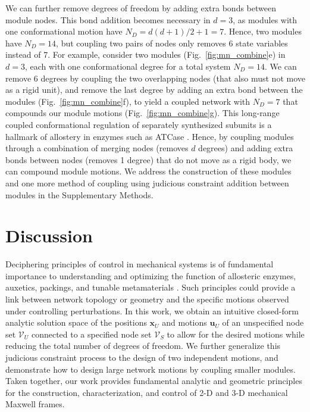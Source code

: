 \documentclass[%
preprint,
 amsmath,amssymb,
 aps,
]{revtex4-1}
\newcommand{\mc}{\mathcal}
\begin{document}
We can further remove degrees of freedom by adding extra bonds between module nodes. This bond addition becomes necessary in $d = 3$, as modules with one conformational motion have $N_D = d(d+1)/2+1 = 7$. Hence, two modules have $N_D = 14$, but coupling two pairs of nodes only removes 6 state variables instead of 7. For example, consider two modules (Fig.~\ref{fig:mn_combine}e) in $d=3$, each with one conformational degree for a total system $N_D = 14$. We can remove 6 degrees by coupling the two overlapping nodes (that also must not move as a rigid unit), and remove the last degree by adding an extra bond between the modules (Fig.~\ref{fig:mn_combine}f), to yield a coupled network with $N_D = 7$ that compounds our module motions (Fig.~\ref{fig:mn_combine}g). This long-range coupled conformational regulation of separately synthesized subunits is a hallmark of allostery in enzymes \cite{changeux1998} such as ATCase \cite{allewell1989,macol2001,cockrell2013}. Hence, by coupling modules through a combination of merging nodes (removes $d$ degrees) and adding extra bonds between nodes (removes 1 degree) that do not move as a rigid body, we can compound module motions. We address the construction of these modules and one more method of coupling using judicious constraint addition between modules in the Supplementary Methods. 




\section{Discussion}

Deciphering principles of control in mechanical systems is of fundamental importance to understanding and optimizing the function of allosteric enzymes, auxetics, packings, and tunable metamaterials \cite{Bertoldi2017,Miskin2013adapting,jacobs2001protein,paulose2015topological,jacobs2012allostery}. Such principles could provide a link between network topology or geometry and the specific motions observed under controlling perturbations. In this work, we obtain an intuitive closed-form analytic solution space of the positions $\bm{x}_U$ and motions $\bm{u}_U$ of an unspecified node set $\mc{V}_U$ connected to a specified node set $\mc{V}_S$ to allow for the desired motions while reducing the total number of degrees of freedom. We further generalize this judicious constraint process to the design of two independent motions, and demonstrate how to design large network motions by coupling smaller modules. Taken together, our work provides fundamental analytic and geometric principles for the construction, characterization, and control of 2-D and 3-D mechanical Maxwell frames.
\end{document}
